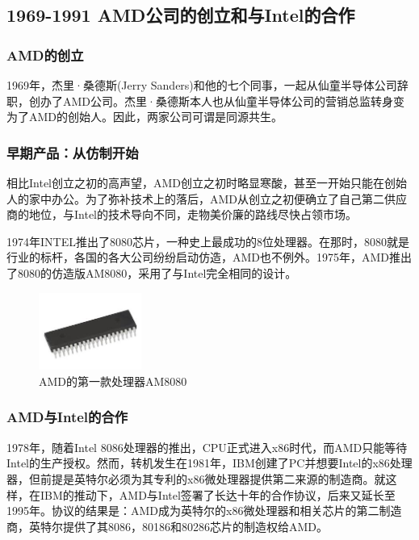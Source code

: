 \documentclass[UTF8]{ctexart}
\begin{document}
\subsection{1969-1991 AMD公司的创立和与Intel的合作}
\subsubsection{AMD的创立}
1969年，杰里·桑德斯(Jerry Sanders)和他的七个同事，一起从仙童半导体公司辞职，创办了AMD公司。杰里·桑德斯本人也从仙童半导体公司的营销总监转身变为了AMD的创始人。因此，两家公司可谓是同源共生。


\subsubsection{早期产品：从仿制开始}
相比Intel创立之初的高声望，AMD创立之初时略显寒酸，甚至一开始只能在创始人的家中办公。为了弥补技术上的落后，AMD从创立之初便确立了自己第二供应商的地位，与Intel的技术导向不同，走物美价廉的路线尽快占领市场。

1974年INTEL推出了8080芯片，一种史上最成功的8位处理器。在那时，8080就是行业的标杆，各国的各大公司纷纷启动仿造，AMD也不例外。1975年，AMD推出了8080的仿造版AM8080，采用了与Intel完全相同的设计。
\begin{figure}[H]
    \begin{center}
        \includegraphics[width=0.3\textwidth]{figure/AM8080.jpg}
        \caption{AMD的第一款处理器AM8080}
    \end{center}
\end{figure}

\subsubsection{AMD与Intel的合作}
1978年，随着Intel 8086处理器的推出，CPU正式进入x86时代，而AMD只能等待Intel的生产授权。然而，转机发生在1981年，IBM创建了PC并想要Intel的x86处理器，但前提是英特尔必须为其专利的x86微处理器提供第二来源的制造商。就这样，在IBM的推动下，AMD与Intel签署了长达十年的合作协议，后来又延长至1995年。协议的结果是：AMD成为英特尔的x86微处理器和相关芯片的第二制造商，英特尔提供了其8086，80186和80286芯片的制造权给AMD。
\end{document}
